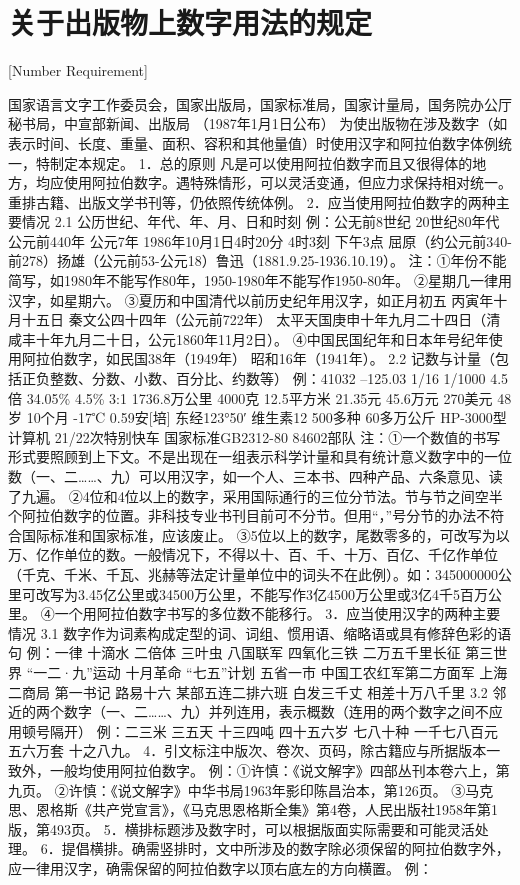\chapter{关于出版物上数字用法的规定}[Number Requirement]

国家语言文字工作委员会，国家出版局，国家标准局，国家计量局，国务院办公厅秘书局，中宣部新闻、出版局
（1987年1月1日公布）
为使出版物在涉及数字（如表示时间、长度、重量、面积、容积和其他量值）时使用汉字和阿拉伯数字体例统一，特制定本规定。
1．总的原则
凡是可以使用阿拉伯数字而且又很得体的地方，均应使用阿拉伯数字。遇特殊情形，可以灵活变通，但应力求保持相对统一。重排古籍、出版文学书刊等，仍依照传统体例。
2．应当使用阿拉伯数字的两种主要情况
2.1  公历世纪、年代、年、月、日和时刻
例：公无前8世纪  20世纪80年代  公元前440年  公元7年  1986年10月1日4时20分  4时3刻  下午3点  屈原（约公元前340-前278）扬雄（公元前53-公元18）鲁迅（1881.9.25-1936.10.19）。
注：①年份不能简写，如1980年不能写作80年，1950-1980年不能写作1950-80年。
②星期几一律用汉字，如星期六。
③夏历和中国清代以前历史纪年用汉字，如正月初五  丙寅年十月十五日  秦文公四十四年（公元前722年）  太平天国庚申十年九月二十四日（清咸丰十年九月二十日，公元1860年11月2日）。
④中国民国纪年和日本年号纪年使用阿拉伯数字，如民国38年（1949年）  昭和16年（1941年）。
2.2  记数与计量（包括正负整数、分数、小数、百分比、约数等）
例：41032 –125.03  1/16  1/1000  4.5倍  34.05\%  4.5\%  3:1  1736.8万公里  4000克  12.5平方米  21.35元  45.6万元  270美元  48岁  10个月  -17℃  0.59安[培]  东经123°50′  维生素12  500多种  60多万公斤  HP-3000型计算机  21/22次特别快车  国家标准GB2312-80  84602部队
注：①一个数值的书写形式要照顾到上下文。不是出现在一组表示科学计量和具有统计意义数字中的一位数（一、二……、九）可以用汉字，如一个人、三本书、四种产品、六条意见、读了九遍。
②4位和4位以上的数字，采用国际通行的三位分节法。节与节之间空半个阿拉伯数字的位置。非科技专业书刊目前可不分节。但用“，”号分节的办法不符合国际标准和国家标准，应该废止。
③5位以上的数字，尾数零多的，可改写为以万、亿作单位的数。一般情况下，不得以十、百、千、十万、百亿、千亿作单位（千克、千米、千瓦、兆赫等法定计量单位中的词头不在此例）。如：345000000公里可改写为3.45亿公里或34500万公里，不能写作3亿4500万公里或3亿4千5百万公里。
④一个用阿拉伯数字书写的多位数不能移行。
3．应当使用汉字的两种主要情况
3.1  数字作为词素构成定型的词、词组、惯用语、缩略语或具有修辞色彩的语句
例：一律  十滴水  二倍体  三叶虫  八国联军  四氧化三铁  二万五千里长征  第三世界  “一二·九”运动  十月革命  “七五”计划  五省一市  中国工农红军第二方面军  上海二商局 第一书记  路易十六  某部五连二排六班  白发三千丈  相差十万八千里
3.2  邻近的两个数字（一、二……、九）并列连用，表示概数（连用的两个数字之间不应用顿号隔开）
例：二三米  三五天  十三四吨  四十五六岁  七八十种  一千七八百元  五六万套  十之八九。
4．引文标注中版次、卷次、页码，除古籍应与所据版本一致外，一般均使用阿拉伯数字。
例：①许慎：《说文解字》四部丛刊本卷六上，第九页。
②许慎：《说文解字》中华书局1963年影印陈昌治本，第126页。
③马克思、恩格斯《共产党宣言》，《马克思恩格斯全集》第4卷，人民出版社1958年第1版，第493页。
5．横排标题涉及数字时，可以根据版面实际需要和可能灵活处理。
6．提倡横排。确需竖排时，文中所涉及的数字除必须保留的阿拉伯数字外，应一律用汉字，确需保留的阿拉伯数字以顶右底左的方向横置。
例：

